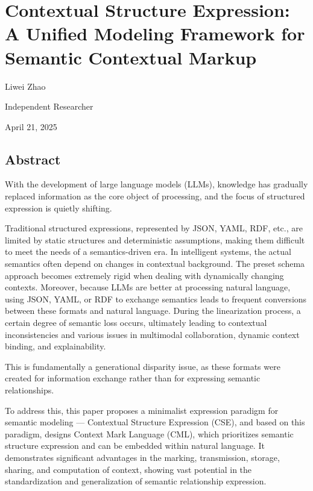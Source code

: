 \documentclass[conference]{IEEEtran}
\begin{document}
\section{Contextual Structure Expression: A Unified Modeling Framework
for Semantic Contextual
Markup}\label{contextual-structure-expression-a-unified-modeling-framework-for-semantic-contextual-markup}

Liwei Zhao

Independent Researcher

April 21, 2025

\subsection{Abstract}\label{abstract}

With the development of large language models (LLMs), knowledge has
gradually replaced information as the core object of processing, and the
focus of structured expression is quietly shifting.

Traditional structured expressions, represented by JSON, YAML, RDF,
etc., are limited by static structures and deterministic assumptions,
making them difficult to meet the needs of a semantics-driven era. In
intelligent systems, the actual semantics often depend on changes in
contextual background. The preset schema approach becomes extremely
rigid when dealing with dynamically changing contexts. Moreover, because
LLMs are better at processing natural language, using JSON, YAML, or RDF
to exchange semantics leads to frequent conversions between these
formats and natural language. During the linearization process, a
certain degree of semantic loss occurs, ultimately leading to contextual
inconsistencies and various issues in multimodal collaboration, dynamic
context binding, and explainability.

This is fundamentally a generational disparity issue, as these formats
were created for information exchange rather than for expressing
semantic relationships.

To address this, this paper proposes a minimalist expression paradigm
for semantic modeling --- Contextual Structure Expression (CSE), and
based on this paradigm, designs Context Mark Language (CML), which
prioritizes semantic structure expression and can be embedded within
natural language. It demonstrates significant advantages in the marking,
transmission, storage, sharing, and computation of context, showing vast
potential in the standardization and generalization of semantic
relationship expression.
\end{document}
